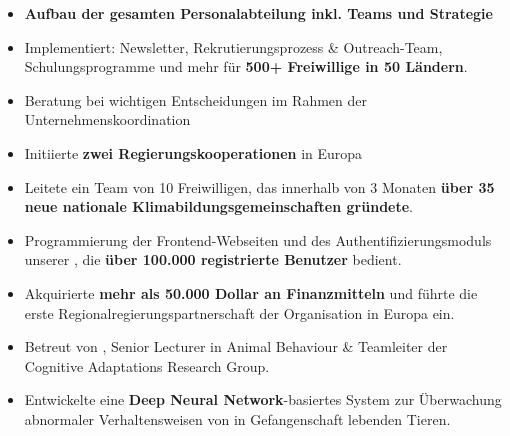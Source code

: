 \documentclass[10pt,a4paper,ragged2e,withhyper]{altacv}
\begin{document}
\begin{paracol}{2}


\begin{itemize}
    \item \textbf{Aufbau der gesamten Personalabteilung inkl. Teams und  Strategie}
    \item Implementiert: Newsletter, Rekrutierungsprozess \& Outreach-Team, Schulungsprogramme und mehr für \textbf{500+ Freiwillige in 50 Ländern}.
    \item Beratung bei wichtigen Entscheidungen im Rahmen der Unternehmenskoordination
\end{itemize}

\divider

\begin{itemize}
    \item Initiierte \textbf{zwei Regierungskooperationen} in Europa
    \item Leitete ein Team von 10 Freiwilligen, das innerhalb von 3 Monaten \textbf{über 35 neue nationale Klimabildungsgemeinschaften gründete}.
\end{itemize}

\divider

\begin{itemize}
    \item Programmierung der Frontend-Webseiten und des Authentifizierungsmoduls unserer , die \textbf{über 100.000 registrierte Benutzer} bedient.
    \item Akquirierte \textbf{mehr als 50.000 Dollar an Finanzmitteln} und führte die erste Regionalregierungspartnerschaft der Organisation in Europa ein.
\end{itemize}
 

\begin{itemize}
    \item Betreut von , Senior Lecturer in Animal Behaviour \& Teamleiter der Cognitive Adaptations Research Group.
    \item Entwickelte eine \textbf{Deep Neural Network}-basiertes System zur Überwachung abnormaler Verhaltensweisen von in Gefangenschaft lebenden Tieren.
\end{itemize}


\end{paracol}
\end{document}
